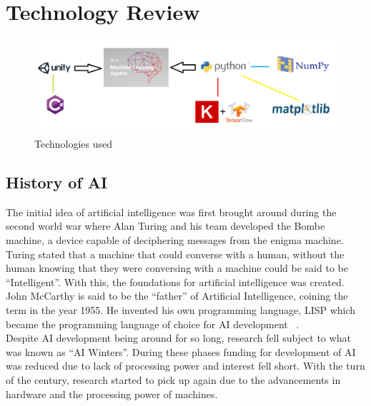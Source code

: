 
\chapter{Technology Review}

\begin{figure}[H]
    \centering
    \includegraphics[width=130mm, height=35mm]{img/TechUsed.png}
    \caption{Technologies used}
    \label{fig:sd4}
\end{figure}

\section{History of AI}
The initial idea of artificial intelligence was first brought around during the second world war where Alan Turing and his team developed the Bombe machine, a device capable of deciphering messages from the enigma machine. Turing stated that a machine that could converse with a human, without the human knowing that they were conversing with a machine could be said to be “Intelligent”.  With this, the foundations for artificial intelligence was created. 
\\
John McCarthy is said to be the “father” of Artificial Intelligence, coining the term in the year 1955. He invented his own programming language, LISP which became the programming language of choice for AI development ~\cite{mccarthy1989artificial}. 
\\
Despite AI development being around for so long, research fell subject to what was known as “AI Winters”. During these phases funding for development of AI was reduced due to lack of processing power and interest fell short. With the turn of the century, research started to pick up again due to the advancements in hardware and the processing power of machines.

